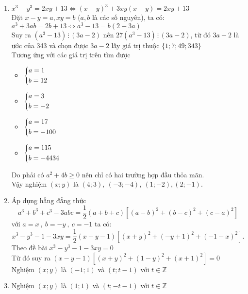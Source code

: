 \begin{bt}
{\begin{enumerate}
        $(1) \Leftrightarrow (x-y)(x^2+xy+y^2)=xy+25$\\
        Do $x-y \geq 1$ và $x^2+xy+y^2 >0$ nên $x^2+xy+y^2 \leq xy+25$\\
        Suy ra $x^2+y^2 \leq 25$ nên $x \leq 4$\\
        Mặt khác do $x>y$ nên $xy \leq 2$. Từ (1) suy ra \\
        $x^3-y^3 \geq 27 \Rightarrow x^3 >27 \Rightarrow x >3$\\
        Từ (2) và (3) suy ra $x=4$. Do $y<x$ nên $y\in\{1;2;3\}$\\
        Chỉ có $y=3$ thỏa mãn (1)\\
        Nghiệm $(x;y)$ là $(4;3)$
        \item $x^3-y^3=2xy+13 \Leftrightarrow (x-y)^3+3xy(x-y)=2xy+13$\\
        Đặt $x-y=a,xy=b$ ($a,b$ là các số nguyên), ta có:\\
        $a^3+3ab=2b+13 \Leftrightarrow a^3-13=b(2-3a)$\\
        Suy ra $(a^3-13)\, \vdots \, (3a-2)$ nên $27(a^3-13)\, \vdots \, (3a-2)$, từ đó $3a-2$ là ước của 343 và chọn được $3a-2$ lấy giá trị thuộc $\{1;7;49;343\}$\\
        Tương ứng với các giá trị trên tìm được 
        \begin{multicols}{4}
            \begin{itemize}
                \item $\left\{\begin{aligned}&a=1\\&b=12\end{aligned}\right.$
                \item $\left\{\begin{aligned}&a=3\\&b=-2\end{aligned}\right.$
                \item $\left\{\begin{aligned}&a=17\\&b=-100\end{aligned}\right.$
                \item $\left\{\begin{aligned}&a=115\\&b=-4434\end{aligned}\right.$
            \end{itemize}
        \end{multicols}
        Do phải có $a^2 +4b \geq 0$ nên chỉ có hai trường hợp đầu thỏa mãn.\\
        Vậy nghiệm $(x;y)$ là $(4;3),\ (-3;-4),\ (1;-2),  (2;-1)$.
        \item Áp dụng hằng đẳng thức \\
        $$a^3+b^3+c^3-3abc=\dfrac{1}{2}(a+b+c)[(a-b)^2+(b-c)^2+(c-a)^2]$$ 
        với $a=x\ ,\ b=-y\ ,\ c=-1$ ta có: $$x^3-y^3-1-3xy=\dfrac{1}{2}(x-y-1)[(x+y)^2+(-y+1)^2+(-1-x)^2].$$
        Theo đề bài $x^3-y^3-1-3xy=0$\\
        Từ đó suy ra $(x-y-1)[(x+y)^2+(1-y)^2+(x+1)^2]=0$\\
        Nghiệm $(x;y)$ là $(-1;1)$ và $(t;t-1)$ với $t\in\mathbb{Z}$
        \item Nghiệm $(x;y)$ là $(1;1)$ và $(t;-t-1)$ với $t\in\mathbb{Z}$
\end{enumerate}
}
\end{bt}

